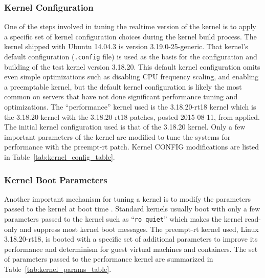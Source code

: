 \subsubsection{Kernel Configuration} %
\label{ssub:kernel_configuration}
One of the steps involved in tuning the realtime version of the kernel is to apply a specific set of kernel configuration choices during the kernel build process.
The kernel shipped with Ubuntu 14.04.3 is version 3.19.0-25-generic.
That kernel's default configuration (\texttt{.config} file) is used as the basis for the configuration and building of the test kernel version 3.18.20. 
This default kernel configuration omits even simple optimizations such as disabling CPU frequency scaling, and enabling a preemptable kernel, but the default kernel configuration is likely the most common on servers that have not done significant performance tuning and optimizations. 
The ``performance'' kernel used is the 3.18.20-rt18 kernel which is the 3.18.20 kernel with the 3.18.20-rt18 patches, posted 2015-08-11, from \autocite{preemptrtsource} applied.
The initial kernel configuration used is that of the 3.18.20 kernel. 
Only a few important parameters of the kernel are modified to tune the systems for performance with the preempt-rt patch.
Kernel CONFIG modifications are listed in Table~\ref{tab:kernel_config_table}.  



\subsubsection{Kernel Boot Parameters} %
\label{ssub:kernel_params}
Another important mechanism for tuning a kernel is to modify the parameters passed to the kernel at boot time \autocite{linuxkernelparams}.  
Standard kernels usually boot with only a few parameters passed to the kernel such as ``\texttt{ro quiet}'' which makes the kernel read-only and suppress most kernel boot messages.  
The preempt-rt kernel used, Linux 3.18.20-rt18, is booted with a specific set of additional parameters to improve its performance and determinism for guest virtual machines and containers.
The set of parameters passed to the performance kernel are summarized in Table~\ref{tab:kernel_params_table}.



